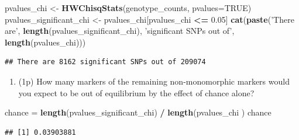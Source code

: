 \documentclass[
]{article}
\newenvironment{Shaded}{\begin{snugshade}}{\end{snugshade}}
\newcommand{\DataTypeTok}[1]{\textcolor[rgb]{0.13,0.29,0.53}{#1}}
\newcommand{\DecValTok}[1]{\textcolor[rgb]{0.00,0.00,0.81}{#1}}
\newcommand{\FloatTok}[1]{\textcolor[rgb]{0.00,0.00,0.81}{#1}}
\newcommand{\KeywordTok}[1]{\textcolor[rgb]{0.13,0.29,0.53}{\textbf{#1}}}
\newcommand{\NormalTok}[1]{#1}
\newcommand{\OperatorTok}[1]{\textcolor[rgb]{0.81,0.36,0.00}{\textbf{#1}}}
\newcommand{\OtherTok}[1]{\textcolor[rgb]{0.56,0.35,0.01}{#1}}
\newcommand{\StringTok}[1]{\textcolor[rgb]{0.31,0.60,0.02}{#1}}
\providecommand{\tightlist}{%
  \setlength{\itemsep}{0pt}\setlength{\parskip}{0pt}}
\begin{document}
\begin{Shaded}
\begin{Highlighting}[]
\NormalTok{pvalues_chi <-}\StringTok{ }\KeywordTok{HWChisqStats}\NormalTok{(genotype_counts, }\DataTypeTok{pvalues=}\OtherTok{TRUE}\NormalTok{)}
\NormalTok{pvalues_significant_chi <-}\StringTok{ }\NormalTok{pvalues_chi[pvalues_chi }\OperatorTok{<=}\StringTok{ }\FloatTok{0.05}\NormalTok{]}
\KeywordTok{cat}\NormalTok{(}\KeywordTok{paste}\NormalTok{(}\StringTok{'There are'}\NormalTok{, }\KeywordTok{length}\NormalTok{(pvalues_significant_chi), }\StringTok{'significant SNPs out of'}\NormalTok{, }\KeywordTok{length}\NormalTok{(pvalues_chi)))}
\end{Highlighting}
\end{Shaded}

\begin{verbatim}
## There are 8162 significant SNPs out of 209074
\end{verbatim}

\begin{enumerate}
\def\labelenumi{\arabic{enumi}.}
\setcounter{enumi}{5}
\tightlist
\item
  (1p) How many markers of the remaining non-monomorphic markers would
  you expect to be out of equilibrium by the effect of chance alone?
\end{enumerate}

\begin{Shaded}
\begin{Highlighting}[]
\NormalTok{chance =}\StringTok{ }\KeywordTok{length}\NormalTok{(pvalues_significant_chi) }\OperatorTok{/}\StringTok{ }\KeywordTok{length}\NormalTok{(pvalues_chi )}
\NormalTok{chance}
\end{Highlighting}
\end{Shaded}

\begin{verbatim}
## [1] 0.03903881
\end{verbatim}

\begin{Shaded}
\end{Shaded}
\end{document}
